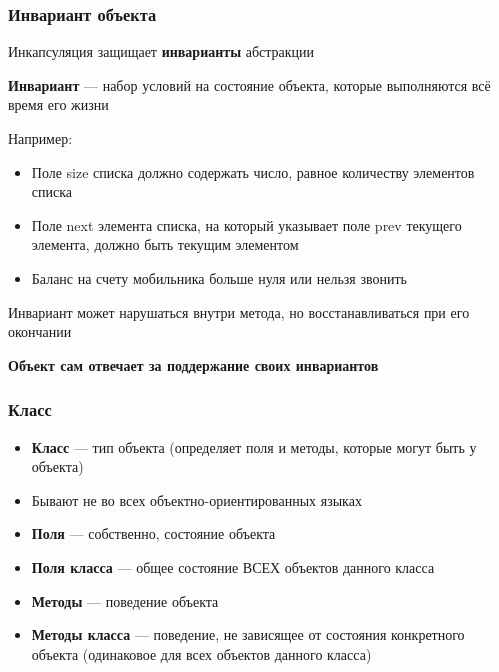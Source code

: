 \documentclass[xetex,mathserif,serif]{beamer}
\begin{document}
    \begin{frame}
        \frametitle{Инвариант объекта}
        Инкапсуляция защищает \textbf{инварианты} абстракции
        
        \textbf{Инвариант} --- набор условий на состояние объекта, которые выполняются всё время его жизни

        Например:
        \begin{itemize}
            \item Поле size списка должно содержать число, равное количеству элементов списка
            \item Поле next элемента списка, на который указывает поле prev текущего элемента, должно быть текущим элементом
            \item Баланс на счету мобильника больше нуля или нельзя звонить
        \end{itemize}

        Инвариант может нарушаться внутри метода, но восстанавливаться при его окончании

        \textbf{Объект сам отвечает за поддержание своих инвариантов}
    \end{frame}

    \begin{frame}
        \frametitle{Класс}
        \begin{itemize}
            \item \textbf{Класс} --- тип объекта (определяет поля и методы, которые могут быть у объекта)
            \item Бывают не во всех объектно-ориентированных языках 
            \item \textbf{Поля} --- собственно, состояние объекта
            \item \textbf{Поля класса} --- общее состояние ВСЕХ объектов данного класса
            \item \textbf{Методы} --- поведение объекта
            \item \textbf{Методы класса} --- поведение, не зависящее от состояния конкретного объекта (одинаковое для всех объектов данного класса)
        \end{itemize}
    \end{frame}
\end{document}

